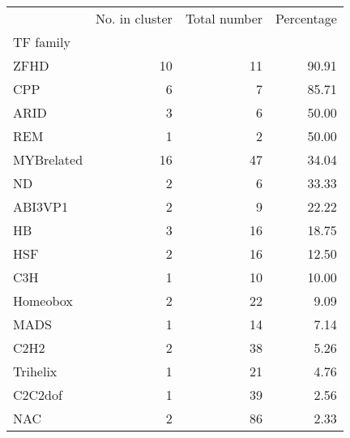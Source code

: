 \begin{tabular}{lrrr}
\toprule
{} &  No. in cluster &  Total number &  Percentage \\
TF family  &                 &               &             \\
\midrule
ZFHD       &              10 &            11 &       90.91 \\
CPP        &               6 &             7 &       85.71 \\
ARID       &               3 &             6 &       50.00 \\
REM        &               1 &             2 &       50.00 \\
MYBrelated &              16 &            47 &       34.04 \\
ND         &               2 &             6 &       33.33 \\
ABI3VP1    &               2 &             9 &       22.22 \\
HB         &               3 &            16 &       18.75 \\
HSF        &               2 &            16 &       12.50 \\
C3H        &               1 &            10 &       10.00 \\
Homeobox   &               2 &            22 &        9.09 \\
MADS       &               1 &            14 &        7.14 \\
C2H2       &               2 &            38 &        5.26 \\
Trihelix   &               1 &            21 &        4.76 \\
C2C2dof    &               1 &            39 &        2.56 \\
NAC        &               2 &            86 &        2.33 \\
\bottomrule
\end{tabular}
